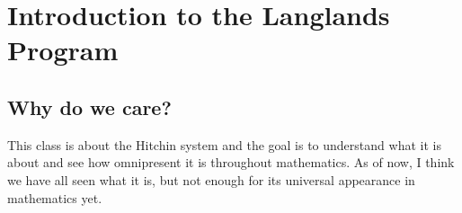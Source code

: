 
\newcommand{\aA}{\mathbb{A}}
\newcommand{\cC}{\mathbb{C}}
\newcommand{\fF}{\mathbb{F}}
\newcommand{\qQ}{\mathbb{Q}}
\newcommand{\rR}{\mathbb{R}}
\newcommand{\zZ}{\mathbb{Z}}
\newcommand{\mr}{\mathrm}


\chapter{Introduction to the Langlands Program}

\section{Why do we care?}

This class is about the Hitchin system and the goal is to understand what it is about and see how omnipresent it is throughout mathematics. As of now, I think we have all seen what it is, but not enough for its universal appearance in mathematics yet.\\

